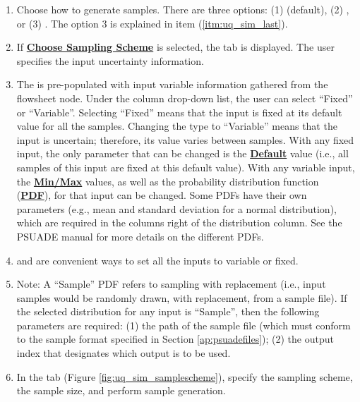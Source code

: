 \begin{enumerate}
\item
	Choose how to generate samples. There are three options:
	(1)  (default), (2) , or (3) . The option 3
	is explained in item (\ref{itm:uq_sim_last}). 
	\label{itm:uq_sim_first}
\item
	If \textbf{\underline{Choose Sampling Scheme}} is selected, the  tab is
	displayed. The user specifies the input uncertainty information.
\item
	The  is pre-populated with input variable
	information gathered from the flowsheet node. Under the  column drop-down list, the user can select ``Fixed'' or ``Variable''. Selecting ``Fixed'' means that the input is fixed at its
	default value for all the samples. Changing the type to ``Variable''
	means that the input is uncertain; therefore, its value varies between
	samples. With any fixed input, the only parameter that can be changed is
	the \textbf{\underline{Default}} value (i.e., all samples of this input are fixed at this
	default value). With any variable input, the \textbf{\underline{Min/Max}} values, as
	well as the probability distribution function (\textbf{\underline{PDF}}), for that input can
	be changed. Some PDFs have their own parameters (e.g., mean and standard
	deviation for a normal distribution), which are required in the
	columns right of the distribution column. See the PSUADE manual for more
	details on the different PDFs.
\item
	 and  are convenient ways to set all the
	inputs to variable or fixed.
\item
	Note: A ``Sample'' PDF refers to sampling with replacement (i.e., input
	samples would be randomly drawn, with replacement, from a sample file). 
   If the selected distribution for any input is ``Sample'', then
   the following parameters are required: (1) the path of the sample
	file (which must conform to the sample format specified in
	Section \ref{ap:psuadefiles}); (2) the output index that designates which
	output is to be used. 
\item
	In the  tab (Figure \ref{fig:uq_sim_samplescheme}),
	specify the sampling scheme, the sample size, and perform sample
	generation.
	\begin{figure}[H]

\end{figure}
\end{enumerate}
